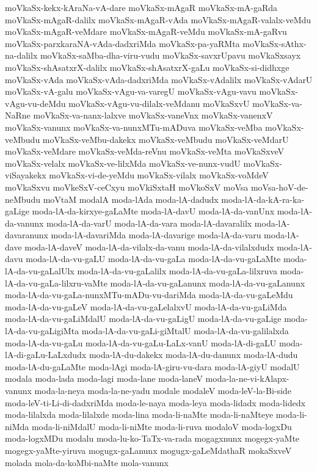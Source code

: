 {moVkaSx-kekx-kAraNa-vA-dare
moVkaSx-mAgaR
moVkaSx-mA-gaRda
moVkaSx-mAgaR-dalilx
moVkaSx-mAgaR-vAda
moVkaSx-mAgaR-valalx-veMdu
moVkaSx-mAgaR-veMdare
moVkaSx-mAgaR-veMdu
moVkaSx-mA-gaRvu
moVkaSx-parxkaraNA-vAda-dadxriMda
moVkaSx-pa-yaRMta
moVkaSx-sAthx-na-dalilx
moVkaSx-saMba-dha-viru-vudu
moVkaSx-savxrUpavu
moVkaSxsayx
moVkaSx-shAsatxrX-dalilx
moVkaSx-shAsatxrX-gaLu
moVkaSx-si-didhxge
moVkaSx-vAda
moVkaSx-vAda-dadxriMda
moVkaSx-vAdalilx
moVkaSx-vAdarU
moVkaSx-vA-galu
moVkaSx-vAgu-va-varegU
moVkaSx-vAgu-vavu
moVkaSx-vAgu-vu-deMdu
moVkaSx-vAgu-vu-dilalx-veMdanu
moVkaSxvU
moVkaSx-va-NaRne
moVkaSx-va-nanx-lalxve
moVkaSx-vaneVnx
moVkaSx-vanenxV
moVkaSx-vanunx
moVkaSx-va-nunxMTu-mADuva
moVkaSx-veMba
moVkaSx-veMbudu
moVkaSx-veMbu-dakekx
moVkaSx-veMbudu
moVkaSx-veMdarU
moVkaSx-veMdare
moVkaSx-veMda-reVnu
moVkaSx-veMta
moVkaSxveV
moVkaSx-velalx
moVkaSx-ve-lilxMda
moVkaSx-ve-nunx-vudU
moVkaSx-viSayakekx
moVkaSx-vi-de-yeMdu
moVkaSx-vilalx
moVkaSx-voMdeV
moVkaSxvu
moVkeSxV-ceCxyu
moVkiSxtaH
moVkoSxV
moVsa
moVsa-hoV-de-neMbudu
moVtaM
modalA
moda-lAda
moda-lA-dadudx
moda-lA-da-kA-ra-ka-gaLige
moda-lA-da-kirxye-gaLaMte
moda-lA-davU
moda-lA-da-vanUnx
moda-lA-da-vanunx
moda-lA-da-varU
moda-lA-da-vara
moda-lA-davaralilx
moda-lA-davaranunx
moda-lA-davariMda
moda-lA-davarige
moda-lA-da-varu
moda-lA-dave
moda-lA-daveV
moda-lA-da-vilalx-da-vanu
moda-lA-da-vilalxdudx
moda-lA-davu
moda-lA-da-vu-gaLU
moda-lA-da-vu-gaLa
moda-lA-da-vu-gaLaMte
moda-lA-da-vu-gaLalUlx
moda-lA-da-vu-gaLalilx
moda-lA-da-vu-gaLa-lilxruva
moda-lA-da-vu-gaLa-lilxru-vaMte
moda-lA-da-vu-gaLanunx
moda-lA-da-vu-gaLanunx
moda-lA-da-vu-gaLa-nunxMTu-mADu-vu-dariMda
moda-lA-da-vu-gaLeMdu
moda-lA-da-vu-gaLeV
moda-lA-da-vu-gaLelalxvU
moda-lA-da-vu-gaLiMda
moda-lA-da-vu-gaLiMdalU
moda-lA-da-vu-gaLigU
moda-lA-da-vu-gaLige
moda-lA-da-vu-gaLigiMta
moda-lA-da-vu-gaLi-giMtalU
moda-lA-da-vu-galilalxda
moda-lA-da-vu-gaLu
moda-lA-da-vu-gaLu-LaLx-vanU
moda-lA-di-gaLU
moda-lA-di-gaLu-LaLxdudx
moda-lA-du-dakekx
moda-lA-du-danunx
moda-lA-dudu
moda-lA-du-gaLaMte
moda-lAgi
moda-lA-giru-vu-dara
moda-lA-giyU
modalU
modala
moda-lada
moda-lagi
moda-lane
moda-laneV
moda-la-ne-vi-kAlapx-vanunx
moda-la-neya
moda-la-ne-yadu
modale
modaleV
moda-leV-la-Bi-side
moda-leV-ti-Li-di-dadxriMda
moda-le-naya
moda-leya
moda-lidadx
moda-lidedx
moda-lilalxda
moda-lilalxde
moda-lina
moda-li-naMte
moda-li-naMteye
moda-li-niMda
moda-li-niMdalU
moda-li-niMte
moda-li-ruva
modaloV
moda-logxDu
moda-logxMDu
modalu
moda-lu-ko-TaTx-va-rada
mogagxnunx
mogegx-yaMte
mogegx-yaMte-yiruva
mogugx-gaLanunx
mogugx-gaLeMdathaR
mokaSxveV
molada
mola-da-koMbi-naMte
mola-vanunx
}
